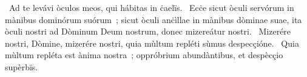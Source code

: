 \psalmChapterWithInscription{}
{ }
{%
~Ad te levávi òculos meos, qui hábitas in ċaelïs. 
~Ecċe sicut òculi servórum in mànibus dominórum suórum~; sicut òculi anċìllae in mànibus dòminae suae, ita òculi nostri ad Dòminum Deum nostrum, donec mizereátur nostri. 
~Mizerére nostri, Dòmine, mizerére nostri, quia mùltum repléti sùmus despecçióne. 
~Quia mùltum repléta est ànima nostra~; oppróbrium abundàntibus, et despècçio supèrbïs. 
}
